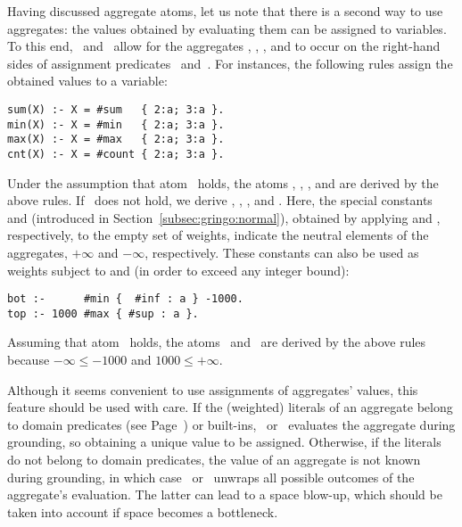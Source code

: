 Having discussed aggregate atoms,
let us note that there is a second way to use aggregates:
the values obtained by evaluating them can be assigned to variables.
To this end, \gringo\ and \clingo\ allow for the aggregates
, , , and  to
occur on the right-hand sides of assignment predicates~\code{=} and~\code{:=}.
%
%
For instances, the following rules assign the obtained values to a variable:
\begin{lstlisting}[numbers=none]
sum(X) :- X = #sum   { 2:a; 3:a }.
min(X) :- X = #min   { 2:a; 3:a }.
max(X) :- X = #max   { 2:a; 3:a }.
cnt(X) :- X = #count { 2:a; 3:a }.
\end{lstlisting}
Under the assumption that atom~ holds,
the atoms , ,
, and  are
derived by the above rules.
If~ does not hold, we derive 
, ,
, and .
Here, the special constants  and 
(introduced in Section~\ref{subsec:gringo:normal}),
obtained by applying  and , respectively,
to the empty set of weights,
indicate the neutral elements of the aggregates,
$+\infty$ and $-\infty$, respectively.
These constants can also be used as weights subject to 
 and  (in order to exceed any integer bound):
\begin{lstlisting}[numbers=none]
bot :-      #min {  #inf : a } -1000.
top :- 1000 #max { #sup : a }.
\end{lstlisting}
Assuming that atom~ holds,
the atoms~ and~ are derived by the above rules
because $-\infty\leq-1000$ and $1000\leq+\infty$.

Although it seems convenient to use assignments of aggregates' values,
this feature should be used with care.
If the (weighted) literals of an aggregate belong to domain predicates
(see Page~\pageref{pg:domain}) or built-ins,
\gringo\ or \clingo\ evaluates the aggregate during grounding, so obtaining
a unique value to be assigned.
%
%
Otherwise, if the literals do not belong to domain predicates,
the value of an aggregate is not known during grounding,
in which case \gringo\ or \clingo\ unwraps all possible outcomes of the
aggregate's evaluation.
The latter can lead to a space blow-up, which should be taken into account
if space becomes a bottleneck.

